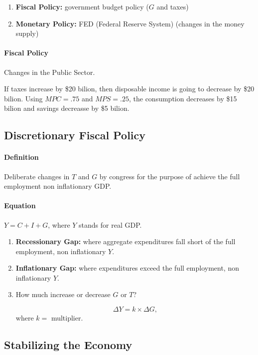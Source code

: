 \begin{enumerate}[label = \textbullet]
	\item \textbf{Fiscal Policy:} government budget policy ($G$ and taxes)
	\item \textbf{Monetary Policy:} FED (Federal Reserve System) (changes in the money supply)
\end{enumerate}

\paragraph{Fiscal Policy} Changes in the Public Sector.

If taxes increase by \$20 bilion, then disposable income is going to decrease by \$20 bilion. Using $MPC = .75$ and $MPS = .25$, the consumption decreases by \$15 bilion and savings decreasse by \$5 bilion.

\subsection{Discretionary Fiscal Policy}

\paragraph{Definition} Deliberate changes in $T$ and $G$ by congress for the purpose of achieve the full employment non inflationary GDP.

\paragraph{Equation} $Y = C + I + G$, where $Y$ stands for real GDP.

\begin{enumerate}[label = \textbf{(\arabic*)}]
	\item \textbf{Recessionary Gap:} where aggregate expenditures fall short of the full employment, non inflationary $Y$.

	\item \textbf{Inflationary Gap:} where expenditures exceed the full employment, non inflationary $Y$.

	\item How much increase or decrease $G$ or $T$?

		\[
			\Delta Y = k \times \Delta G,
		\]
		where $k = $ multiplier.
\end{enumerate}

\subsection{Stabilizing the Economy}

